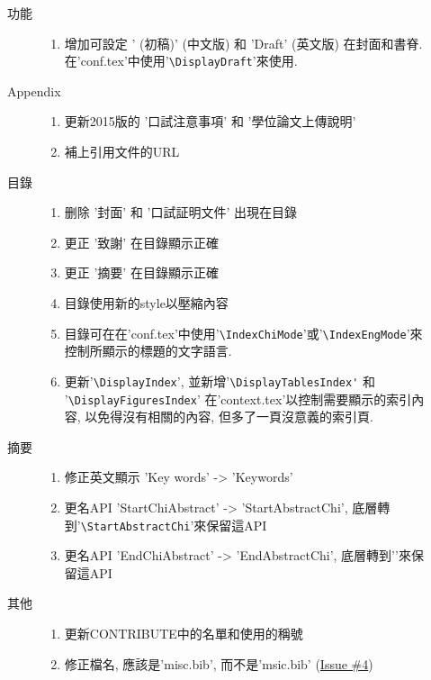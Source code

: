 \begin{description}
\begin{description}
\begin{enumerate}
        \end{enumerate}
      \item[功能] \hfill
        \begin{enumerate}
          \item 增加可設定 ' (初稿)' (中文版) 和 'Draft' (英文版) 在封面和書脊. 在'conf.tex'中使用'\verb|\DisplayDraft|'來使用.
        \end{enumerate}
      \item[Appendix] \hfill
        \begin{enumerate}
          \item 更新2015版的 '口試注意事項' 和 '學位論文上傳說明'
          \item 補上引用文件的URL
        \end{enumerate}
      \item[目錄] \hfill
        \begin{enumerate}
          \item 删除 '封面' 和 '口試証明文件' 出現在目錄
          \item 更正 '致謝' 在目錄顯示正確
          \item 更正 '摘要' 在目錄顯示正確
          \item 目錄使用新的style以壓縮內容
          \item 目錄可在在'conf.tex'中使用'\verb|\IndexChiMode|'或'\verb|\IndexEngMode|'來控制所顯示的標題的文字語言.
          \item 更新'\verb|\DisplayIndex|', 並新增'\verb|\DisplayTablesIndex'| 和 '\verb|\DisplayFiguresIndex|' 在'context.tex'以控制需要顯示的索引內容, 以免得沒有相關的內容, 但多了一頁沒意義的索引頁.
        \end{enumerate}
      \item[摘要] \hfill
        \begin{enumerate}
          \item 修正英文顯示 'Key words' -> 'Keywords'
          \item 更名API 'StartChiAbstract' -> 'StartAbstractChi', 底層轉到'\verb|\StartAbstractChi|'來保留這API
          \item 更名API 'EndChiAbstract' -> 'EndAbstractChi', 底層轉到'\EndAbstractChi'來保留這API
        \end{enumerate}
      \item[其他] \hfill
        \begin{enumerate}
          \item 更新CONTRIBUTE中的名單和使用的稱號
          \item 修正檔名, 應該是'misc.bib', 而不是'msic.bib' (\href{https://github.com/wengan-li/ncku-thesis-template-latex/issues/4}{Issue \#4})

\end{enumerate}
\end{description}
\end{description}
